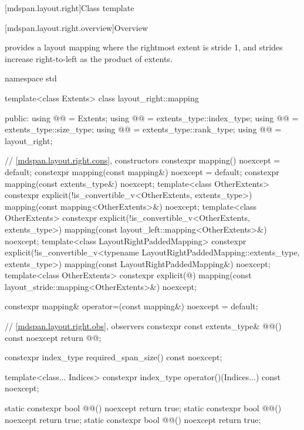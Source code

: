 [mdspan.layout.right]{Class template }

[mdspan.layout.right.overview]{Overview}

\pnum
{} provides a layout mapping
where the rightmost extent is stride 1, and
strides increase right-to-left as the product of extents.

%
\begin{codeblock}
namespace std {
  template<class Extents>
  class layout_right::mapping {
  public:
    using @@ = Extents;
    using @@ = extents_type::index_type;
    using @@ = extents_type::size_type;
    using @@ = extents_type::rank_type;
    using @@ = layout_right;

    // \ref{mdspan.layout.right.cons}, constructors
    constexpr mapping() noexcept = default;
    constexpr mapping(const mapping&) noexcept = default;
    constexpr mapping(const extents_type&) noexcept;
    template<class OtherExtents>
      constexpr explicit(!is_convertible_v<OtherExtents, extents_type>)
        mapping(const mapping<OtherExtents>&) noexcept;
    template<class OtherExtents>
      constexpr explicit(!is_convertible_v<OtherExtents, extents_type>)
        mapping(const layout_left::mapping<OtherExtents>&) noexcept;
    template<class LayoutRightPaddedMapping>
      constexpr explicit(!is_convertible_v<typename LayoutRightPaddedMapping::extents_type,
                                           extents_type>)
        mapping(const LayoutRightPaddedMapping&) noexcept;
    template<class OtherExtents>
      constexpr explicit(@\seebelow@)
        mapping(const layout_stride::mapping<OtherExtents>&) noexcept;

    constexpr mapping& operator=(const mapping&) noexcept = default;

    // \ref{mdspan.layout.right.obs}, observers
    constexpr const extents_type& @@() const noexcept { return @@; }

    constexpr index_type required_span_size() const noexcept;

    template<class... Indices>
      constexpr index_type operator()(Indices...) const noexcept;

    static constexpr bool @@() noexcept { return true; }
    static constexpr bool @@() noexcept { return true; }
    static constexpr bool @@() noexcept { return true; }

}}
\end{codeblock}
